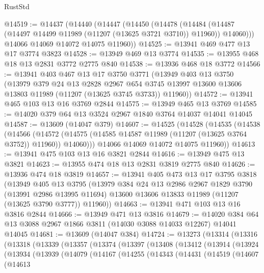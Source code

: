 \begin{lexlean}{RustStd}
\begin{coremodule}
@14519 := @14437
    (@14440
      (@14447
        (@14450
          (@14478
            (@14484 (@14487 (@14497 @14499 @11989 (@11207 (@13625 @3721 @3710)) @11960)) @14060)))
        @14066
        @14069
        @14072
        @14075
        @11960))
@14525 := @13941 @469 @477 @13 @17 @3774 @3823
@14528 := @13949 @469 @13 @3774
@14535 := @13955 @468 @18 @13 @2831 @3772 @2775 @840
@14538 := @13936 @468 @18 @3772
@14566 := @13941
    @403
    @467
    @13
    @17
    @3750
    @3771
    (@13949
      @403
      @13
      @3750
      (@13979
        @379
        @24
        @13
        @2828
        @2967
        @654
        @3745
        @13997
        @13600
        @13606
        @13803
        @11989
        (@11207 (@13625 @3745 @3733))
        @11960))
@14572 := @13941 @465 @103 @13 @16 @3769 @2844
@14575 := @13949 @465 @13 @3769
@14585 := @14020 @379 @64 @13 @3524 @2967 @1840 @3764 @14037 @14041 @14045
@14587 := @13609 (@14047 @379)
@14607 := @14525
    (@14528
      (@14535
        (@14538
          (@14566
            (@14572 (@14575 (@14585 @14587 @11989 (@11207 (@13625 @3764 @3752)) @11960)) @14060)))
        @14066
        @14069
        @14072
        @14075
        @11960))
@14613 := @13941 @475 @103 @13 @16 @3821 @2844
@14616 := @13949 @475 @13 @3821
@14623 := @13955 @474 @18 @13 @2831 @3819 @2775 @840
@14626 := @13936 @474 @18 @3819
@14657 := @13941
    @405
    @473
    @13
    @17
    @3795
    @3818
    (@13949
      @405
      @13
      @3795
      (@13979
        @384
        @24
        @13
        @2986
        @2967
        @1829
        @3790
        (@13991 @2986 @13995 @11694)
        @13600
        @13606
        @13833
        @11989
        (@11207 (@13625 @3790 @3777))
        @11960))
@14663 := @13941 @471 @103 @13 @16 @3816 @2844
@14666 := @13949 @471 @13 @3816
@14679 := @14020 @384 @64 @13 @3088 @2967 @1866 @3811 (@14030 @3088 @14033 @12267) @14041 @14045
@14681 := @13609 (@14047 @384)
@14724 := @13273
    (@13314
      (@13316
        (@13318
          (@13339
            (@13357
              (@13374
                (@13397
                  (@13408
                    (@13412
                      (@13914
                        (@13924
                          (@13934
                            (@13939
                              (@14079
                                (@14167
                                  (@14255
                                    (@14343
                                      (@14431
                                        (@14519
                                          (@14607
                                            (@14613

\end{coremodule}
\end{lexlean}
